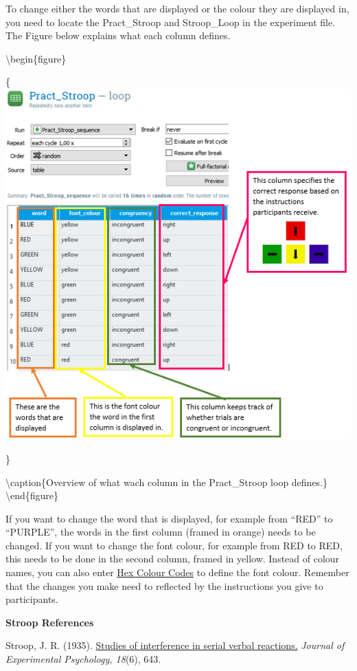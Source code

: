 \documentclass[
]{book}
\begin{document}
To change either the words that are displayed or the colour they are displayed in, you need to locate the Pract\_Stroop and Stroop\_Loop in the experiment file. The Figure below explains what each column defines.

\textbackslash begin\{figure\}

\{\centering \includegraphics[width=0.99\linewidth]{images/changestroop/01loop}

\}

\textbackslash caption\{Overview of what wach column in the Pract\_Stroop loop defines.\}\label{fig:Figure3-17}
\textbackslash end\{figure\}

If you want to change the word that is displayed, for example from ``RED'' to ``PURPLE'', the words in the first column (framed in orange) needs to be changed. If you want to change the font colour, for example from {RED} to {RED}, this needs to be done in the second column, framed in yellow. Instead of colour names, you can also enter \href{https://htmlcolorcodes.com/}{Hex Colour Codes} to define the font colour. Remember that the changes you make need to reflected by the instructions you give to participants.

\textbf{Stroop References}

Stroop, J. R. (1935). \href{https://pure.mpg.de/rest/items/item_2389918/component/file_2389917/content}{Studies of interference in serial verbal reactions.} \emph{Journal of Experimental Psychology, 18}(6), 643.
\end{document}

